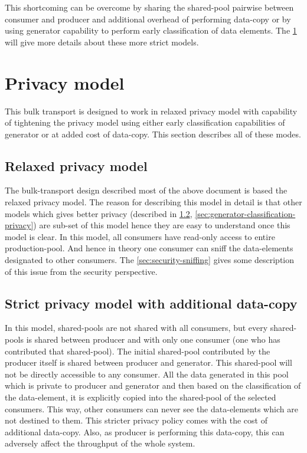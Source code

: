 \documentclass[a4paper,twoside]{report} %
\begin{document}
This shortcoming can be overcome by sharing the shared-pool pairwise
between consumer and producer and additional overhead of performing
data-copy or by using generator capability to perform early
classification of data elements.  The \ref{sec:privacy} will give more
details about these more strict models.

\section{Privacy model}
\label{sec:privacy}
This bulk transport is designed to work in relaxed privacy model with
capability of tightening the privacy model using either early
classification capabilities of generator or at added cost of
data-copy.  This section describes all of these modes.

\subsection{Relaxed privacy model}
\label{sec:relaxed-privacy}
The bulk-transport design described most of the above document is 
based the relaxed privacy model.  The reason for describing this model
in detail is that other models which gives better privacy (described
in \ref{sec:data-copy-privacy},
\ref{sec:generator-classification-privacy}) are sub-set of this model 
hence they are easy to understand once this model is clear.  
In this model, all consumers have read-only access to entire 
production-pool.  And hence in theory one consumer can sniff the
data-elements designated to other consumers.  The 
\ref{sec:security-sniffing} gives some description of this issue from
the security perspective.


\subsection{Strict privacy model with additional data-copy}
\label{sec:data-copy-privacy}
In this model, shared-pools are not shared with all consumers, but
every shared-pools is shared between producer and with only 
one consumer (one who has contributed that shared-pool).  The initial
shared-pool contributed by the producer itself is shared between
producer and generator.  This shared-pool will not be directly 
accessible to any consumer.  All the data generated in this pool which
is private to producer and generator and then based on the
classification of the data-element, it is explicitly copied into the
shared-pool of the selected consumers.  This way, other consumers can
never see the data-elements which are not destined to them.  This
stricter privacy policy comes with the cost of additional data-copy.
Also, as producer is performing this data-copy, this can adversely
affect the throughput of the whole system.
\end{document}
